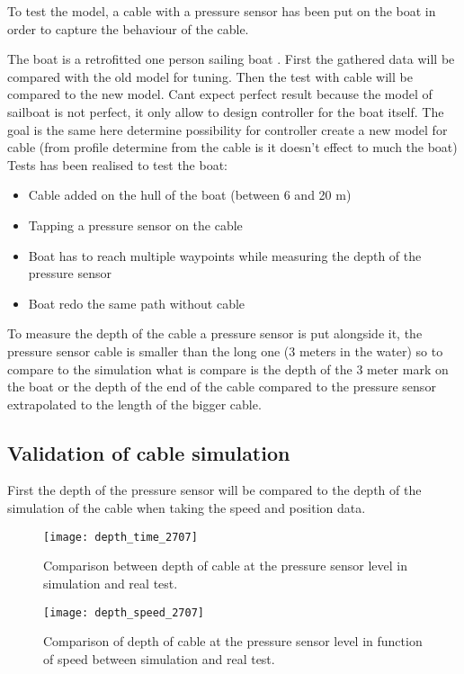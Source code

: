 To test the model, a cable with a pressure sensor has been put on the boat in order to capture the behaviour
of the cable.

The boat is a retrofitted one person sailing boat . 
First the gathered data will be compared with the old model for tuning. Then the test with cable will be compared to the new model.
Cant expect perfect result because the model of sailboat is not perfect, it only allow to design controller for the boat itself. The goal is the same here determine possibility for controller create a new model for cable (from profile determine from the cable is it doesn't effect to much the boat)
Tests has been realised to test the boat:

\begin{itemize}
\item Cable added on the hull of the boat (between 6 and 20 m)
\item Tapping a pressure sensor on the cable
\item Boat has to reach multiple waypoints while measuring the depth of the pressure sensor
\item Boat redo the same path without cable
\end{itemize}

To measure the depth of the cable a pressure sensor is put alongside it, the pressure sensor cable is smaller than 
the long one (3 meters in the water) so to compare to the simulation what is compare is the depth of the 3 meter mark on the boat or the depth of the end of the cable compared to the pressure sensor extrapolated to the length of the bigger cable.

\subsection{Validation of cable simulation}

First the depth of the pressure sensor will be compared to the depth of the simulation of the cable when taking the speed and position data.

\begin{figure}[H]
\centering
    \begin{minipage}[b]{0.4\textwidth}
    \centering
    \texttt{[image: depth\_time\_2707]}
    \caption{Comparison between depth of cable at the pressure sensor level in simulation and real test.}
    \label{fig:comp_depth_time_2007}
    \end{minipage}
    \hfill
    \begin{minipage}[b]{0.45\textwidth}
    \centering
    \texttt{[image: depth\_speed\_2707]}
    \caption{Comparison of depth of cable at the pressure sensor level in function of speed between simulation and real test.}
    \label{fig:comp_depth_speed_2007}
    \end{minipage}
\end{figure}
